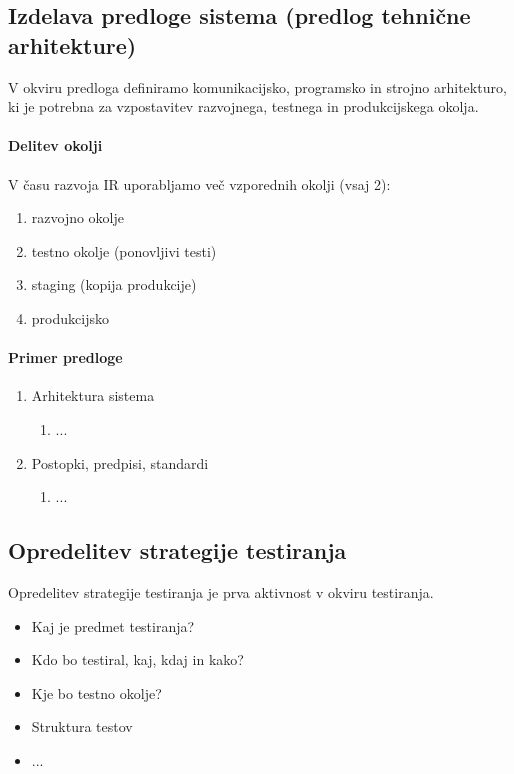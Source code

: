 \documentclass[a4paper,12pt]{report}
\begin{document}
   \subsection{Izdelava predloge sistema (predlog tehnične arhitekture)}
   V okviru predloga definiramo komunikacijsko, programsko in strojno arhitekturo, ki je potrebna za vzpostavitev razvojnega, testnega in produkcijskega okolja.

   \paragraph{Delitev okolji} V času razvoja IR uporabljamo več vzporednih okolji (vsaj 2):
   \begin{enumerate}
      \item razvojno okolje
      \item testno okolje (ponovljivi testi)
      \item staging (kopija produkcije)
      \item produkcijsko
   \end{enumerate}

   \paragraph{Primer predloge}
   \begin{enumerate}
      \item Arhitektura sistema
      \begin{enumerate}
         \item ...
      \end{enumerate}
      \item Postopki, predpisi, standardi
      \begin{enumerate}
         \item ...
      \end{enumerate}
   \end{enumerate}

   \subsection{Opredelitev strategije testiranja}
   Opredelitev strategije testiranja je prva aktivnost v okviru testiranja.
   \begin{itemize}
      \item Kaj je predmet testiranja?
      \item Kdo bo testiral, kaj, kdaj in kako?
      \item Kje bo testno okolje?
      \item Struktura  testov
      \item ...
   \end{itemize}
\end{document}
